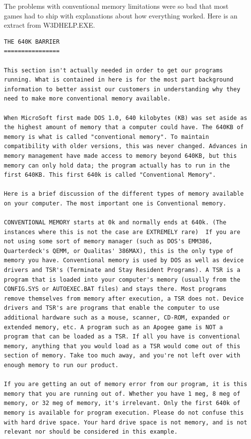 \documentclass[book.tex]{subfiles}
\begin{document}
The problems with conventional memory limitations were so bad that most games had to ship with explanations about how everything worked. Here is an extract from W3DHELP.EXE.\\

 
   \begin{lstlisting}[breaklines=true,breakindent=0em]
THE 640K BARRIER
================

This section isn't actually needed in order to get our programs running. What is contained in here is for the most part background information to better assist our customers in understanding why they need to make more conventional memory available.

When MicroSoft first made DOS 1.0, 640 kilobytes (KB) was set aside as the highest amount of memory that a computer could have. The 640KB of memory is what is called "conventional memory". To maintain compatibility with older versions, this was never changed. Advances in memory management have made access to memory beyond 640KB, but this memory can only hold data; the program actually has to run in the first 640KB. This first 640k is called "Conventional Memory".

Here is a brief discussion of the different types of memory available on your computer. The most important one is Conventional memory.

CONVENTIONAL MEMORY starts at 0k and normally ends at 640k. (The instances where this is not the case are EXTREMELY rare)  If you are not using some sort of memory manager (such as DOS's EMM386, Quarterdeck's QEMM, or Qualitas' 386MAX), this is the only type of memory you have. Conventional memory is used by DOS as well as device drivers and TSR's (Terminate and Stay Resident Programs). A TSR is a program that is loaded into your computer's memory (usually from the CONFIG.SYS or AUTOEXEC.BAT files) and stays there. Most programs remove themselves from memory after execution, a TSR does not. Device drivers and TSR's are programs that enable the computer to use additional hardware such as a mouse, scanner, CD-ROM, expanded or extended memory, etc. A program such as an Apogee game is NOT a program that can be loaded as a TSR. If all you have is conventional memory, anything that you would load as a TSR would come out of this section of memory. Take too much away, and you're not left over with enough memory to run our product.

If you are getting an out of memory error from our program, it is this memory that you are running out of. Whether you have 1 meg, 8 meg of memory, or 32 meg of memory, it's irrelevant. Only the first 640k of memory is available for program execution. Please do not confuse this with hard drive space. Your hard drive space is not memory, and is not relevant nor should be considered in this example.


\end{lstlisting}
\end{document}
